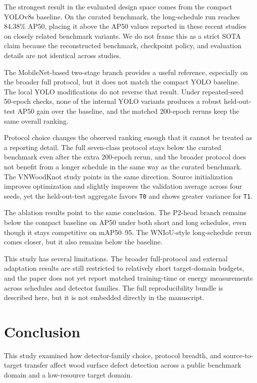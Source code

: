 \documentclass[cmc,article,submit,moreauthors,pdftex]{Definitions/tsp}
\begin{document}
The strongest result in the evaluated design space comes from the compact YOLOv8s baseline. On the curated benchmark, the long-schedule run reaches 84.38\% AP50, placing it above the AP50 values reported in these recent studies on closely related benchmark variants. We do not frame this as a strict SOTA claim because the reconstructed benchmark, checkpoint policy, and evaluation details are not identical across studies.

The MobileNet-based two-stage branch provides a useful reference, especially on the broader full protocol, but it does not match the compact YOLO baseline. The local YOLO modifications do not reverse that result. Under repeated-seed 50-epoch checks, none of the internal YOLO variants produces a robust held-out-test AP50 gain over the baseline, and the matched 200-epoch reruns keep the same overall ranking.

Protocol choice changes the observed ranking enough that it cannot be treated as a reporting detail. The full seven-class protocol stays below the curated benchmark even after the extra 200-epoch rerun, and the broader protocol does not benefit from a longer schedule in the same way as the curated benchmark. The VNWoodKnot study points in the same direction. Source initialization improves optimization and slightly improves the validation average across four seeds, yet the held-out-test aggregate favors \texttt{T0} and shows greater variance for \texttt{T1}.

The ablation results point to the same conclusion. The P2-head branch remains below the compact baseline on AP50 under both short and long schedules, even though it stays competitive on mAP50--95. The WNIoU-style long-schedule rerun comes closer, but it also remains below the baseline.

This study has several limitations. The broader full-protocol and external adaptation results are still restricted to relatively short target-domain budgets, and the paper does not yet report matched training-time or energy measurements across schedules and detector families. The full reproducibility bundle is described here, but it is not embedded directly in the manuscript.

\section{Conclusion}
\label{sec:conclusion}

This study examined how detector-family choice, protocol breadth, and source-to-target transfer affect wood surface defect detection across a public benchmark domain and a low-resource target domain.
\end{document}
